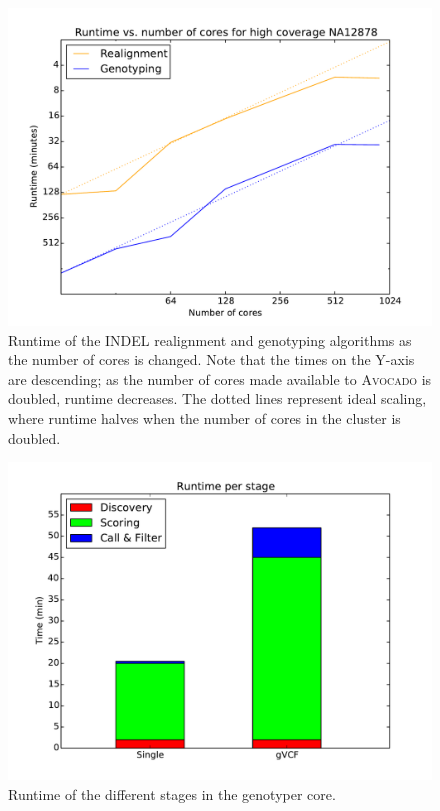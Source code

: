 \documentclass{bioinfo}
\begin{document}
\begin{figure}
\begin{center}
\includegraphics[width=0.75\linewidth]{graphs/speedup.pdf}
\end{center}
\caption{Runtime of the INDEL realignment and genotyping algorithms as the
number of cores is changed. Note that the times on the Y-axis are descending; as
the number of cores made available to \textsc{Avocado} is doubled, runtime
decreases. The dotted lines represent ideal scaling, where runtime halves when
the number of cores in the cluster is doubled.}
\label{fig:speedup}
\end{figure}

\begin{figure}
\begin{center}
\includegraphics[width=0.75\linewidth]{graphs/perf.pdf}
\end{center}
\caption{Runtime of the different stages in the genotyper core.}
\label{fig:genotyper-perf}
\end{figure}
\end{document}
